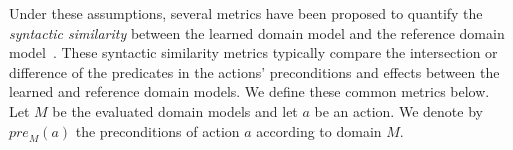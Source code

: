 \documentclass{article}
\theoremstyle{definition}
\theoremstyle{remark}
\newcommand{\pre}{\ensuremath{\textit{pre}}\xspace}
\newif\ifaddcomments
\newcommand{\roni}[1]{\ifaddcomments{\textcolor{red}{[Roni: #1]}}\fi}
\newcommand{\cm}[1]{\ifaddcomments{\textcolor{olive}{[Christian: #1]}}\fi}
\begin{document}
Under these assumptions, several metrics have been proposed to quantify the \emph{syntactic similarity} between the learned domain model and the reference domain model~\citep{aineto2019learning,mordoch2023safe,xi2024neuro,Oswald2024DLLMDomainModeling}.
These syntactic similarity metrics typically compare the intersection or difference of the predicates in the actions' preconditions and effects between the learned and reference domain models. We define these common metrics below. 
Let $M$ be the evaluated domain models and let $a$ be an action. We denote by $\pre_M(a)$ the preconditions of action $a$ according to domain $M$.

\end{document}
